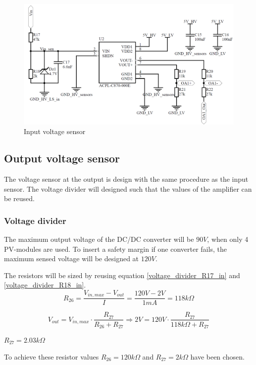 \begin{figure}[H]
	\begin{center}
		\includegraphics[width=0.7\linewidth]{../Pictures/P1/Sensors/input_voltage_sensor.PNG}
		\caption{Input voltage sensor}
		\label{fig:input_voltage_sensor_circuit}
	\end{center}
\end{figure}

\subsection{Output voltage sensor}
The voltage sensor at the output is design with the same procedure as the input sensor. The voltage divider will designed such that the values of the amplifier can be reused.

\subsubsection{Voltage divider}
The maximum output voltage of the DC/DC converter will be $90V$, when only 4 PV-modules are used. To insert a safety margin if one converter fails, the maximum sensed voltage will be designed at $120V$.

The resistors will be sized by reusing equation \ref{voltage_divider_R17_in} and \ref{voltage_divider_R18_in}.
\begin{equation}
	R_{26} = \frac{V_{in,max}-V_{out}}{I} = \frac{120V-2V}{1mA} = 118k\Omega	
\end{equation}

\begin{equation} 
	V_{out} = V_{in,max} \cdot \frac{R_{27}}{R_{26}+R_{27}} \Rightarrow 2V = 120V \cdot \frac{R_{27}}{118k\Omega+R_{27}}
\end{equation}
\begin{center}
	$R_{27} = 2.03k\Omega$
\end{center}

To achieve these resistor values $R_{26} = 120k\Omega$ and $R_{27} = 2k\Omega$ have been chosen. 

